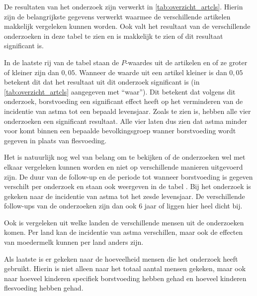 \documentclass[table,abstract=true]{scrartcl}
\begin{document}
De resultaten van het onderzoek zijn verwerkt in \cref{tab:overzicht_artcls}. Hierin zijn de belangrijkste gegevens verwerkt waarmee de verschillende artikelen makkelijk vergeleken kunnen worden. Ook valt het resultaat van de verschillende onderzoeken in deze tabel te zien en is makkelijk te zien of dit resultaat significant is. 

In de laatste rij van de tabel staan de $P$-waardes uit de artikelen en of ze groter of kleiner zijn dan $0,05$. Wanneer de waarde uit een artikel kleiner is dan $0,05$ betekent dit dat het resultaat uit dit onderzoek significant is (in \cref{tab:overzicht_artcls} aangegeven met “waar”). Dit betekent dat volgens dit onderzoek, borstvoeding een significant effect heeft op het verminderen van de incidentie van astma tot een bepaald levensjaar. Zoals te zien is, hebben alle vier onderzoeken een significant resultaat. Alle vier laten dus zien dat astma minder voor komt binnen een bepaalde bevolkingsgroep wanner borstvoeding wordt gegeven in plaats van flesvoeding. 

Het is natuurlijk nog wel van belang om te bekijken of de onderzoeken wel met elkaar vergeleken kunnen worden en niet op verschillende manieren uitgevoerd zijn. De duur van de follow-up en de periode tot wanneer borstvoeding is gegeven verschilt per onderzoek en staan ook weergeven in de tabel . Bij het onderzoek is  gekeken naar de incidentie van astma tot het zesde levensjaar. De verschillende follow-ups van de onderzoeken zijn dan ook 6 jaar of liggen hier heel dicht bij. 

Ook is vergeleken uit welke landen de verschillende mensen uit de onderzoeken komen. Per land kan de incidentie van astma verschillen, maar ook de effecten van moedermelk kunnen per land anders zijn. 

Als laatste is er gekeken naar de hoeveelheid mensen die het onderzoek heeft gebruikt. Hierin is niet alleen naar het totaal aantal mensen gekeken, maar ook naar hoeveel kinderen specifiek borstvoeding hebben gehad en hoeveel kinderen flesvoeding hebben gehad. 
\end{document}
